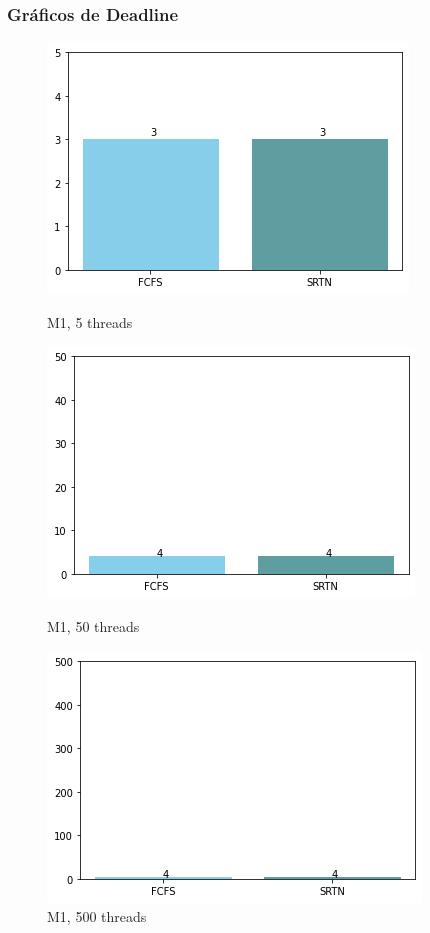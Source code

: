 \documentclass{beamer}
\begin{document}
\begin{frame}
\frametitle{Gráficos de Deadline}

\blindtext

\begin{figure}[!htb]
  \includegraphics[width=\linewidth]{imgs/deadline5-1.png}
  \caption{M1, 5 threads}\label{fig:awesome_image1}
\endminipage\hfill
{}
  \includegraphics[width=\linewidth]{imgs/deadline50-1.png}
  \caption{M1, 50 threads}\label{fig:awesome_image2}
\endminipage\hfill
{}%
  \includegraphics[width=\linewidth]{imgs/deadline500-1.png}
  \caption{M1, 500 threads}\label{fig:awesome_image3}
\endminipage
\end{figure}


\end{frame}
\end{document}

